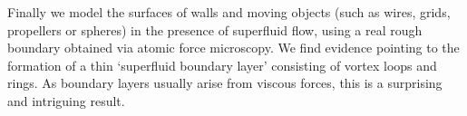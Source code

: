 Finally we model the surfaces of walls and moving objects (such as wires, grids, propellers or spheres) in the presence of superfluid flow, using a real rough boundary obtained via atomic force microscopy. We find evidence pointing to the formation of a thin `superfluid boundary layer' consisting of vortex loops and rings. As boundary layers usually arise from viscous forces, this is a surprising and intriguing result.
\thispagestyle{plain}
\restoregeometry